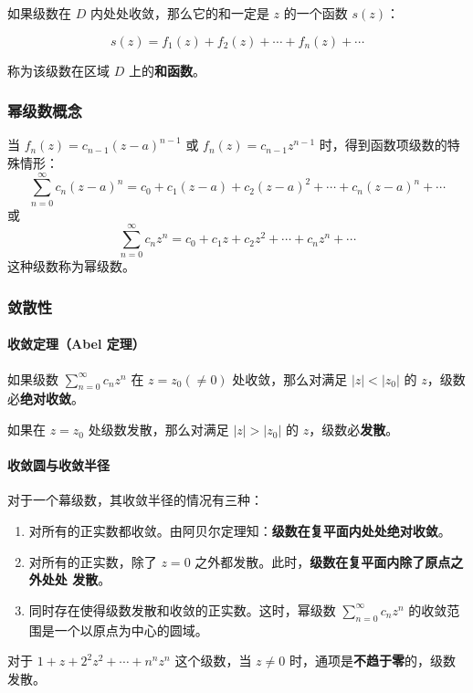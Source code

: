 如果级数在 \(D\) 内处处收敛，那么它的和一定是 \(z\) 的一个函数
\(s(z)\)：

\[
s(z) = f_1(z) + f_2(z) + \cdots + f_n(z) + \cdots
\]

称为该级数在区域 \(D\) 上的\textbf{和函数}。
\subsubsection{幂级数概念}
\label{幂级数概念}
当 \(f_n(z) = c_{n-1}(z-a)^{n-1}\) 或 \(f_n(z) = c_{n-1}z^{n-1}\)
时，得到函数项级数的特殊情形：
\[
\sum_{n=0}^{\infty} c_n (z-a)^n = c_0 + c_1(z-a) + c_2(z-a)^2 + \cdots + c_n(z-a)^n + \cdots
\]
或
\[
\sum_{n=0}^{\infty} c_n z^n = c_0 + c_1 z + c_2 z^2 + \cdots + c_n z^n + \cdots
\]
这种级数称为幂级数。
\subsubsection{敛散性}
\label{敛散性}
\paragraph{收敛定理（Abel 定理）}
\label{收敛定理 abel 定理}
如果级数 \(\sum_{n=0}^{\infty} c_{n} z^{n}\) 在 \(z = z_{0} (\neq 0)\)
处收敛，那么对满足 \(|z| < |z_{0}|\) 的 \(z\)，级数必\textbf{绝对收敛}。

如果在 \(z = z_{0}\) 处级数发散，那么对满足 \(|z| > |z_{0}|\) 的
\(z\)，级数必\textbf{发散}。
\paragraph{收敛圆与收敛半径}
\label{收敛圆与收敛半径}
对于一个幕级数，其收敛半径的情况有三种：

\begin{enumerate}
\item 对所有的正实数都收敛。由阿贝尔定理知：\textbf{级数在复平面内处处绝对收敛}。
\item 对所有的正实数，除了 \(z=0\) 之外都发散。此时，\textbf{级数在复平面内除了原点之外处处
发散}。
\item 同时存在使得级数发散和收敛的正实数。这时，幂级数
\(\sum\limits_{n=0}^{\infty}c_nz^n\) 的收敛范围是一个以原点为中心的圆域。
\end{enumerate}

\begin{tcolorbox}[title={Example},colback=red!5!white
,colframe=red!75!black
,colbacktitle=yellow!50!red
,coltitle=red!25!black, fonttitle=\bfseries,subtitle style={boxrule=0.4pt, colback=yellow!50!red!25!white}]
对于 \(1+z+2^2z^2+\cdots+n^nz^n\) 这个级数，当
\(z \ne 0\) 时，通项是\textbf{不趋于零}的，级数发散。

\end{tcolorbox}
